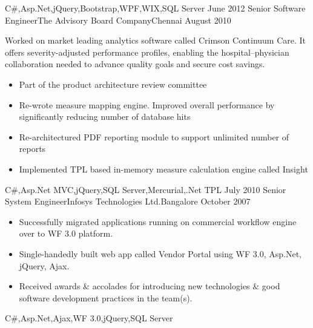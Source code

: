 \begin{experiences}
                    {C\#,Asp.Net,jQuery,Bootstrap,WPF,WIX,SQL Server}
  \emptySeparator         
  \experience
  {June 2012}  {Senior Software Engineer}{The Advisory Board Company}{Chennai}
  {August 2010}   {
                      Worked on market leading analytics software called Crimson Continuum Care. It offers severity-adjusted performance profiles, enabling the hospital–physician collaboration needed to advance quality goals and secure cost savings.  
                      \begin{itemize}
                        \item Part of the product architecture review committee
                        \item Re-wrote measure mapping engine. Improved overall performance by significantly reducing number of database hits
                        \item Re-architectured PDF reporting module to support unlimited number of reports
                        \item Implemented TPL based in-memory measure calculation engine called Insight  
                      \end{itemize}
                  }
                  {C\#,Asp.Net MVC,jQuery,SQL Server,Mercurial,.Net TPL} 
  \emptySeparator         
  \experience
  {July 2010}  {Senior System Engineer}{Infosys Technologies Ltd.}{Bangalore}
  {October 2007}   {
				  	\begin{itemize}                                         
				  		\item Successfully migrated applications running on commercial workflow engine over to WF 3.0 platform.
				  		\item Single-handedly built web app called Vendor Portal using WF 3.0, Asp.Net, jQuery, Ajax.
				  		\item Received awards \& accolades for introducing new technologies \& good software development practices in the team(s).
				  	\end{itemize}
				  }
  				  {C\#,Asp.Net,Ajax,WF 3.0,jQuery,SQL Server}
\end{experiences}
